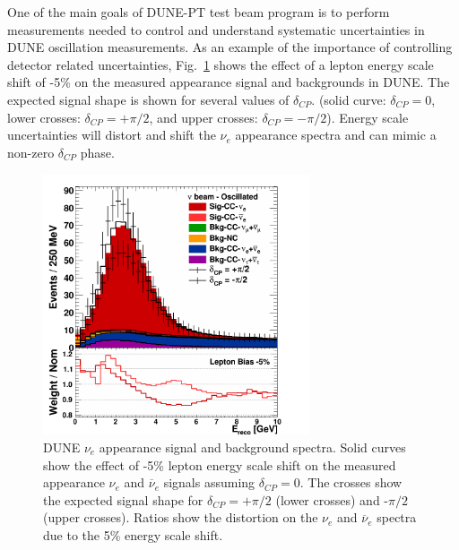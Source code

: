 One of the main goals of DUNE-PT test beam program is to perform measurements 
needed to control and understand systematic uncertainties in DUNE oscillation measurements.
As an example of the importance of controlling detector related uncertainties,
Fig.~\ref{fig:spectraleffect} shows the effect of a lepton energy scale 
shift of -5\% on the measured 
appearance signal %
 and backgrounds in DUNE. 
The expected signal shape is shown for several values of $\delta_{CP}$. 
(solid curve: $\delta_{CP}=0$, lower crosses: $\delta_{CP}=+\pi/2$, and upper crosses: $\delta_{CP}=-\pi/2$). 
Energy scale uncertainties will distort and shift the $\nu_e$ appearance spectra and
can mimic a non-zero
$\delta_{CP}$ phase.
\begin{figure}[h!]
\centering
\includegraphics[width=0.7\textwidth,height=7.7cm]{figures/CSPP_LeptonBias_nue_app_FHC}
  \caption{DUNE $\nu_e$ appearance signal and background spectra. 
Solid curves show the effect of -5\% lepton energy scale shift on the 
measured appearance $\nu_e$ and $\overline{\nu}_e$ signals assuming $\delta_{CP}=0$.
The crosses show the expected signal shape for $\delta_{CP}=+\pi/2$ (lower crosses) and -$\pi/2$  (upper crosses). 
Ratios show the distortion on the $\nu_e$ and $\overline{\nu}_e$ spectra due to the 
5\% energy scale shift.
}
\label{fig:spectraleffect}
\end{figure}



